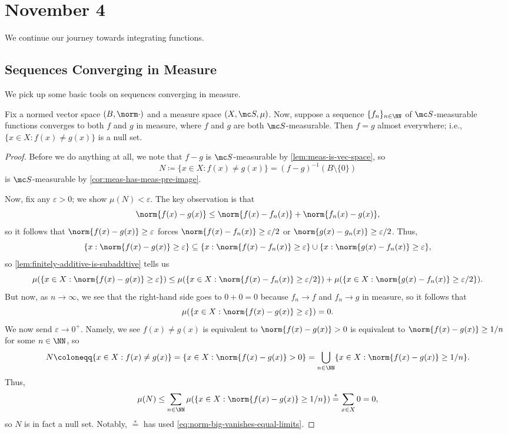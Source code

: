 \documentclass[../notes.tex]{subfiles}
\begin{document}
\section{November 4}

We continue our journey towards integrating functions.

\subsection{Sequences Converging in Measure}
We pick up some basic tools on sequences converging in measure.
\begin{lemma} \label{lem:converge-in-measure-uniq-ae}
	Fix a normed vector space $(B,\norm\cdot)$ and a measure space $(X,\mc S,\mu)$. Now, suppose a sequence $\{f_n\}_{n\in\NN}$ of $\mc S$-measurable functions converges to both $f$ and $g$ in measure, where $f$ and $g$ are both $\mc S$-measurable. Then $f=g$ almost everywhere; i.e., $\{x\in X:f(x)\ne g(x)\}$ is a null set.
\end{lemma}
\begin{proof}
	Before we do anything at all, we note that $f-g$ is $\mc S$-measurable by \autoref{lem:meas-is-vec-space}, so
	\[N\coloneqq\{x\in X:f(x)\ne g(x)\}=(f-g)^{-1}(B\setminus\{0\})\]
	is $\mc S$-measurable by \autoref{cor:meas-has-meas-pre-image}.
	
	Now, fix any $\varepsilon>0$; we show $\mu(N)<\varepsilon$. The key observation is that
	\[\norm{f(x)-g(x)}\le\norm{f(x)-f_n(x)}+\norm{f_n(x)-g(x)},\]
	so it follows that $\norm{f(x)-g(x)}\ge\varepsilon$ forces $\norm{f(x)-f_n(x)}\ge\varepsilon/2$ or $\norm{g(x)-g_n(x)}\ge\varepsilon/2$. Thus,
	\[\{x:\norm{f(x)-g(x)}\ge\varepsilon\}\subseteq\{x:\norm{f(x)-f_n(x)}\ge\varepsilon\}\cup\{x:\norm{g(x)-f_n(x)}\ge\varepsilon\},\]
	so \autoref{lem:finitely-additive-is-subaddtive} tells us
	\[\mu(\{x\in X:\norm{f(x)-g(x)}\ge\varepsilon\})\le\mu(\{x\in X:\norm{f(x)-f_n(x)}\ge\varepsilon/2\})+\mu(\{x\in X:\norm{g(x)-f_n(x)}\ge\varepsilon/2\}).\]
	But now, as $n\to\infty$, we see that the right-hand side goes to $0+0=0$ because $f_n\to f$ and $f_n\to g$ in measure, so it follows that
	\begin{equation}
		\mu(\{x\in X:\norm{f(x)-g(x)}\ge\varepsilon\})=0. \label{eq:norm-big-vanishes-equal-limits}
	\end{equation}
	We now send $\varepsilon\to0^+$. Namely, we see $f(x)\ne g(x)$ is equivalent to $\norm{f(x)-g(x)}>0$ is equivalent to $\norm{f(x)-g(x)}\ge1/n$ for some $n\in\NN$, so
	\[N\coloneqq\{x\in X:f(x)\ne g(x)\}=\{x\in X:\norm{f(x)-g(x)}>0\}=\bigcup_{n\in\NN}\{x\in X:\norm{f(x)-g(x)}\ge1/n\}.\]
	Thus,
	\[\mu(N)\le\sum_{n\in\NN}\mu(\{x\in X:\norm{f(x)-g(x)}\ge1/n\})\stackrel*=\sum_{x\in X}0=0,\]
	so $N$ is in fact a null set. Notably, $\stackrel*=$ has used \autoref{eq:norm-big-vanishes-equal-limits}.
\end{proof}
\end{document}
